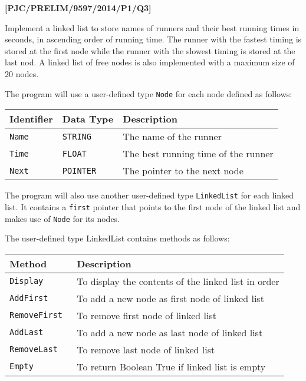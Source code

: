 \documentclass{article}
\begin{document}

\textbf{{[}PJC/PRELIM/9597/2014/P1/Q3{]} }

Implement a linked list to store names of runners and their best running
times in seconds, in ascending order of running time. The runner with
the fastest timing is stored at the first node while the runner with
the slowest timing is stored at the last nod. A linked list of free
nodes is also implemented with a maximum size of 20 nodes. 

The program will use a user-defined type \texttt{Node} for each node
defined as follows: 
\begin{center}
\begin{tabular}{|l|l|l|}
\hline 
\texttt{\textbf{\hspace{0.01\columnwidth}}}\textbf{Identifier} & \texttt{\textbf{\hspace{0.01\columnwidth}}}\textbf{Data Type} & \texttt{\textbf{\hspace{0.05\columnwidth}}}\textbf{Description}\tabularnewline
\hline 
\texttt{Name} & \texttt{STRING} & The name of the runner\tabularnewline
\hline 
\texttt{Time} & \texttt{FLOAT} & The best running time of the runner\tabularnewline
\hline 
\texttt{Next} & \texttt{POINTER} & The pointer to the next node \tabularnewline
\hline 
\end{tabular}
\par\end{center}

The program will also use another user-defined type \texttt{LinkedList}
for each linked list. It contains a \texttt{first} pointer that points
to the first node of the linked list and makes use of \texttt{Node}
for its nodes. 

The user-defined type LinkedList contains methods as follows: 
\begin{center}
\begin{tabular}{|l|l|}
\hline 
\texttt{\textbf{\hspace{0.01\columnwidth}}}\textbf{Method} & \texttt{\textbf{\hspace{0.05\columnwidth}}}\textbf{Description}\tabularnewline
\hline 
\texttt{Display } & To display the contents of the linked list in order \tabularnewline
\hline 
\texttt{AddFirst } & To add a new node as first node of linked list\tabularnewline
\hline 
\texttt{RemoveFirst } & To remove first node of linked list\tabularnewline
\hline 
\texttt{AddLast} & To add a new node as last node of linked list \tabularnewline
\hline 
\texttt{RemoveLast} & To remove last node of linked list\tabularnewline
\hline 
\texttt{Empty} & To return Boolean True if linked list is empty\tabularnewline
\hline 
\end{tabular}
\par\end{center}
\end{document}
